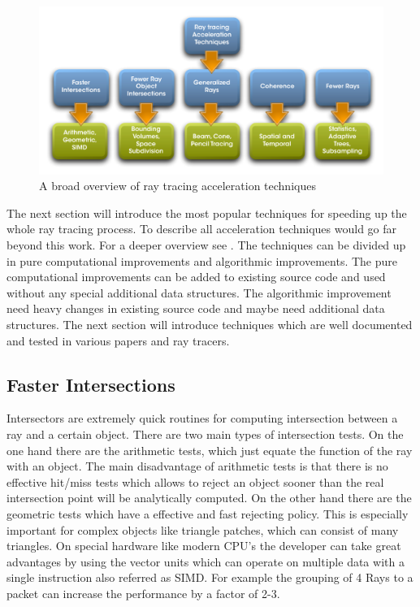 \documentclass[DIV10, abstracton, openright, footsepline, headsepline, twoside, 9pt,
bigheadings]{scrreprt}
\begin{document}
\begin{figure}[H]
\centering
\includegraphics[width=\textwidth]{diagramme/raytracing_acceleration_techniques}
\caption{A broad overview of ray tracing acceleration techniques \cite{Glassner89}}
\label{fig:rayacceltech}
\end{figure}

The next section will introduce the most popular techniques for speeding up the
whole ray tracing process. To describe all acceleration techniques would go far
beyond this work. For a deeper overview see \cite{Wald04} \cite{Glassner89}. The
techniques can be divided up in pure computational improvements and algorithmic
improvements. The pure computational improvements can be added to existing source
code and used without any special additional data structures. The algorithmic
improvement need heavy changes in existing source code and maybe need additional
data structures. The next section will introduce techniques which are well
documented and tested in various papers and ray tracers.

\subsection{Faster Intersections}
Intersectors are extremely quick routines for computing intersection between a
ray and a certain object. There are two main types of intersection tests. On the
one hand there are the arithmetic tests, which just equate the function of the
ray with an object. The main disadvantage of arithmetic tests is that there is
no effective hit/miss tests which allows to reject an object sooner than the
real intersection point will be analytically computed. On the other hand there
are the geometric tests which have a effective and fast rejecting policy. This
is especially important for complex objects like triangle patches, which can
consist of many triangles. On special hardware like modern CPU's the developer
can take great advantages by using the vector units which can operate on
multiple data with a single instruction also referred as SIMD. For example the
grouping of 4 Rays to a packet can increase the performance by a factor of 2-3.
\end{document}
